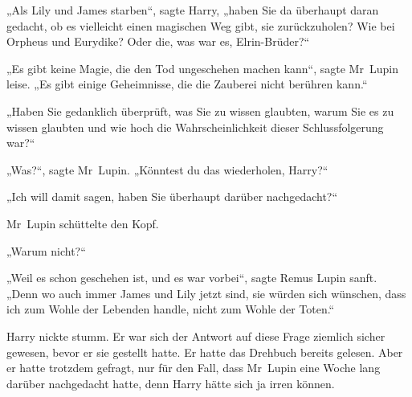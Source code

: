 „Als Lily und James starben“, sagte Harry, „haben Sie da überhaupt daran gedacht, ob es vielleicht einen magischen Weg gibt, sie zurückzuholen? Wie bei Orpheus und Eurydike? Oder die, was war es, Elrin-Brüder?“

„Es gibt keine Magie, die den Tod ungeschehen machen kann“, sagte Mr~Lupin leise. „Es gibt einige Geheimnisse, die die Zauberei nicht berühren kann.“

„Haben Sie gedanklich überprüft, was Sie zu wissen glaubten, warum Sie es zu wissen glaubten und wie hoch die Wahrscheinlichkeit dieser Schlussfolgerung war?“

„Was?“, sagte Mr~Lupin. „Könntest du das wiederholen, Harry?“

„Ich will damit sagen, haben Sie überhaupt darüber nachgedacht?“

Mr~Lupin schüttelte den Kopf.

„Warum nicht?“

„Weil es schon geschehen ist, und es war vorbei“, sagte Remus Lupin sanft. „Denn wo auch immer James und Lily jetzt sind, sie würden sich wünschen, dass ich zum Wohle der Lebenden handle, nicht zum Wohle der Toten.“

Harry nickte stumm. Er war sich der Antwort auf diese Frage ziemlich sicher gewesen, bevor er sie gestellt hatte. Er hatte das Drehbuch bereits gelesen. Aber er hatte trotzdem gefragt, nur für den Fall, dass Mr~Lupin eine Woche lang darüber nachgedacht hatte, denn Harry hätte sich ja irren können.

